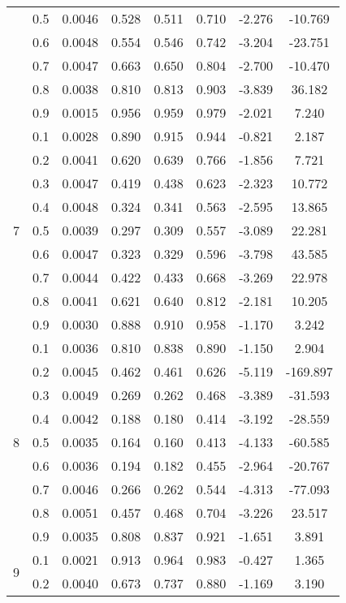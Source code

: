 \documentclass[11pt,a4paper]{report}
\begin{document}
\begin{longtable}{ | c | c || c | c | c | c | c | c | }
 & 0.5 & 0.0046 & 0.528 & 0.511 & 0.710 & -2.276 & -10.769 \\
 & 0.6 & 0.0048 & 0.554 & 0.546 & 0.742 & -3.204 & -23.751 \\
 & 0.7 & 0.0047 & 0.663 & 0.650 & 0.804 & -2.700 & -10.470 \\
 & 0.8 & 0.0038 & 0.810 & 0.813 & 0.903 & -3.839 & 36.182 \\
 & 0.9 & 0.0015 & 0.956 & 0.959 & 0.979 & -2.021 & 7.240 \\
 \hline
\multirow{9}{*}{7} & 0.1 & 0.0028 & 0.890 & 0.915 & 0.944 & -0.821 & 2.187 \\
 & 0.2 & 0.0041 & 0.620 & 0.639 & 0.766 & -1.856 & 7.721 \\
 & 0.3 & 0.0047 & 0.419 & 0.438 & 0.623 & -2.323 & 10.772 \\
 & 0.4 & 0.0048 & 0.324 & 0.341 & 0.563 & -2.595 & 13.865 \\
 & 0.5 & 0.0039 & 0.297 & 0.309 & 0.557 & -3.089 & 22.281 \\
 & 0.6 & 0.0047 & 0.323 & 0.329 & 0.596 & -3.798 & 43.585 \\
 & 0.7 & 0.0044 & 0.422 & 0.433 & 0.668 & -3.269 & 22.978 \\
 & 0.8 & 0.0041 & 0.621 & 0.640 & 0.812 & -2.181 & 10.205 \\
 & 0.9 & 0.0030 & 0.888 & 0.910 & 0.958 & -1.170 & 3.242 \\
 \hline
\multirow{9}{*}{8} & 0.1 & 0.0036 & 0.810 & 0.838 & 0.890 & -1.150 & 2.904 \\
 & 0.2 & 0.0045 & 0.462 & 0.461 & 0.626 & -5.119 & -169.897 \\
 & 0.3 & 0.0049 & 0.269 & 0.262 & 0.468 & -3.389 & -31.593 \\
 & 0.4 & 0.0042 & 0.188 & 0.180 & 0.414 & -3.192 & -28.559 \\
 & 0.5 & 0.0035 & 0.164 & 0.160 & 0.413 & -4.133 & -60.585 \\
 & 0.6 & 0.0036 & 0.194 & 0.182 & 0.455 & -2.964 & -20.767 \\
 & 0.7 & 0.0046 & 0.266 & 0.262 & 0.544 & -4.313 & -77.093 \\
 & 0.8 & 0.0051 & 0.457 & 0.468 & 0.704 & -3.226 & 23.517 \\
 & 0.9 & 0.0035 & 0.808 & 0.837 & 0.921 & -1.651 & 3.891 \\
 \hline
\multirow{9}{*}{9} & 0.1 & 0.0021 & 0.913 & 0.964 & 0.983 & -0.427 & 1.365 \\
 & 0.2 & 0.0040 & 0.673 & 0.737 & 0.880 & -1.169 & 3.190 \\

\end{longtable}
\end{document}
